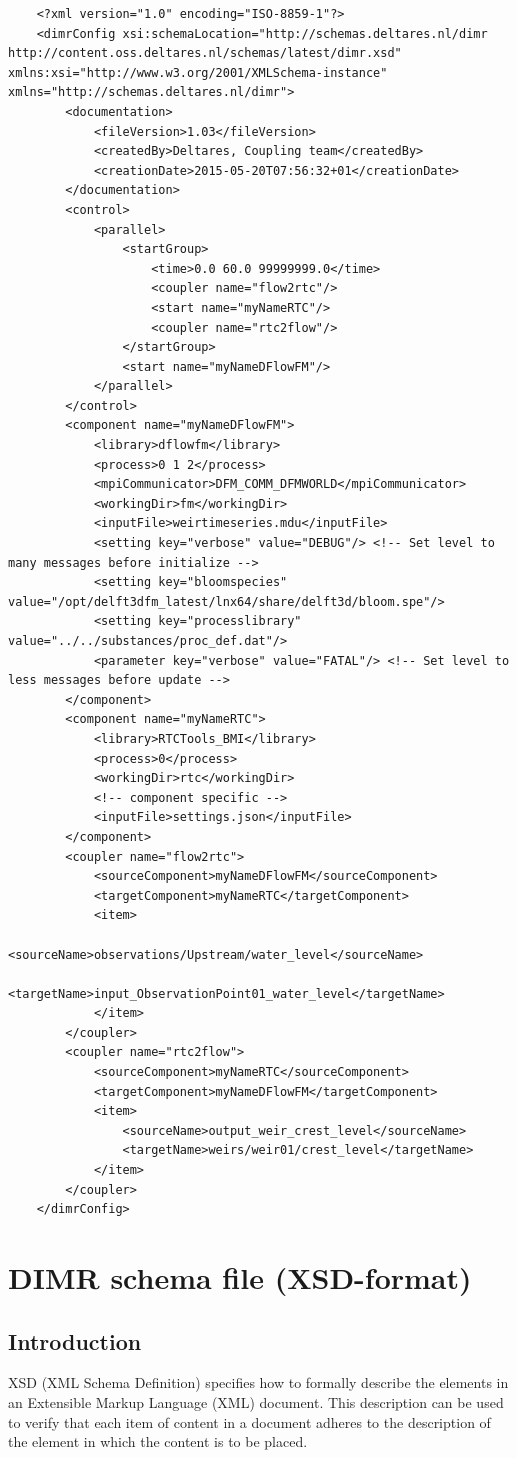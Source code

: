 \documentclass[signature]{deltares_manual}
\newcommand{\dimr}{\textrm{DIMR}\xspace}
\begin{document}
\begin{lstlisting}
	<?xml version="1.0" encoding="ISO-8859-1"?>
	<dimrConfig xsi:schemaLocation="http://schemas.deltares.nl/dimr http://content.oss.deltares.nl/schemas/latest/dimr.xsd" xmlns:xsi="http://www.w3.org/2001/XMLSchema-instance" xmlns="http://schemas.deltares.nl/dimr">
		<documentation>
			<fileVersion>1.03</fileVersion>
			<createdBy>Deltares, Coupling team</createdBy>
			<creationDate>2015-05-20T07:56:32+01</creationDate>
		</documentation>
		<control>
			<parallel>
				<startGroup>
					<time>0.0 60.0 99999999.0</time>
					<coupler name="flow2rtc"/>
					<start name="myNameRTC"/>
					<coupler name="rtc2flow"/>
				</startGroup>
				<start name="myNameDFlowFM"/>
			</parallel>
		</control>
		<component name="myNameDFlowFM">
			<library>dflowfm</library>
			<process>0 1 2</process>
			<mpiCommunicator>DFM_COMM_DFMWORLD</mpiCommunicator>
			<workingDir>fm</workingDir>
			<inputFile>weirtimeseries.mdu</inputFile>
			<setting key="verbose" value="DEBUG"/> <!-- Set level to many messages before initialize -->
			<setting key="bloomspecies" value="/opt/delft3dfm_latest/lnx64/share/delft3d/bloom.spe"/>
			<setting key="processlibrary" value="../../substances/proc_def.dat"/>
			<parameter key="verbose" value="FATAL"/> <!-- Set level to less messages before update -->			
		</component>
		<component name="myNameRTC">
			<library>RTCTools_BMI</library>
			<process>0</process>
			<workingDir>rtc</workingDir>
			<!-- component specific -->
			<inputFile>settings.json</inputFile>
		</component>
		<coupler name="flow2rtc">
			<sourceComponent>myNameDFlowFM</sourceComponent>
			<targetComponent>myNameRTC</targetComponent>
			<item>
				<sourceName>observations/Upstream/water_level</sourceName>
				<targetName>input_ObservationPoint01_water_level</targetName>
			</item>
		</coupler>
		<coupler name="rtc2flow">
			<sourceComponent>myNameRTC</sourceComponent>
			<targetComponent>myNameDFlowFM</targetComponent>
			<item>
				<sourceName>output_weir_crest_level</sourceName>
				<targetName>weirs/weir01/crest_level</targetName>
			</item>
		</coupler>
	</dimrConfig>
\end{lstlisting}
\section{\dimr schema file (XSD-format)}
\label{sec:DIMR_config_XSD}

\subsection{Introduction} 
\label{subsec:xsdintroduction}
XSD (XML Schema Definition) specifies how to formally describe the elements in an Extensible Markup Language (XML) document. This description can be used to verify that each item of content in a document adheres to the description of the element in which the content is to be placed.
\end{document}
